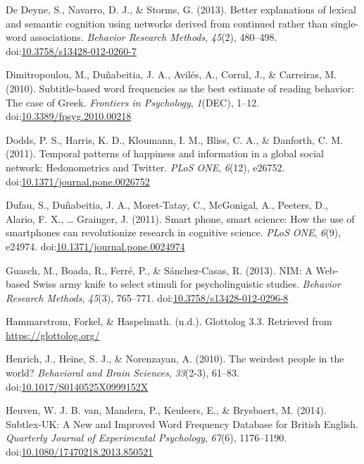 \documentclass[english,,man]{apa6}
\theoremstyle{definition}
\theoremstyle{definition}
\theoremstyle{definition}
\theoremstyle{remark}
\begin{document}
\leavevmode\hypertarget{ref-DeDeyne2013}{}%
De Deyne, S., Navarro, D. J., \& Storms, G. (2013). Better explanations
of lexical and semantic cognition using networks derived from continued
rather than single-word associations. \emph{Behavior Research Methods},
\emph{45}(2), 480--498.
doi:\href{https://doi.org/10.3758/s13428-012-0260-7}{10.3758/s13428-012-0260-7}

\leavevmode\hypertarget{ref-Dimitropoulou2010}{}%
Dimitropoulou, M., Duñabeitia, J. A., Avilés, A., Corral, J., \&
Carreiras, M. (2010). Subtitle-based word frequencies as the best
estimate of reading behavior: The case of Greek. \emph{Frontiers in
Psychology}, \emph{1}(DEC), 1--12.
doi:\href{https://doi.org/10.3389/fpsyg.2010.00218}{10.3389/fpsyg.2010.00218}

\leavevmode\hypertarget{ref-Dodds2011}{}%
Dodds, P. S., Harris, K. D., Kloumann, I. M., Bliss, C. A., \& Danforth,
C. M. (2011). Temporal patterns of happiness and information in a global
social network: Hedonometrics and Twitter. \emph{PLoS ONE},
\emph{6}(12), e26752.
doi:\href{https://doi.org/10.1371/journal.pone.0026752}{10.1371/journal.pone.0026752}

\leavevmode\hypertarget{ref-Dufau2011}{}%
Dufau, S., Duñabeitia, J. A., Moret-Tatay, C., McGonigal, A., Peeters,
D., Alario, F. X., \ldots{} Grainger, J. (2011). Smart phone, smart
science: How the use of smartphones can revolutionize research in
cognitive science. \emph{PLoS ONE}, \emph{6}(9), e24974.
doi:\href{https://doi.org/10.1371/journal.pone.0024974}{10.1371/journal.pone.0024974}

\leavevmode\hypertarget{ref-Guasch2013}{}%
Guasch, M., Boada, R., Ferré, P., \& Sánchez-Casas, R. (2013). NIM: A
Web-based Swiss army knife to select stimuli for psycholinguistic
studies. \emph{Behavior Research Methods}, \emph{45}(3), 765--771.
doi:\href{https://doi.org/10.3758/s13428-012-0296-8}{10.3758/s13428-012-0296-8}

\leavevmode\hypertarget{ref-Glottolog}{}%
Hammarstrom, Forkel, \& Haspelmath. (n.d.). Glottolog 3.3. Retrieved
from \url{https://glottolog.org/}

\leavevmode\hypertarget{ref-Henrich2010}{}%
Henrich, J., Heine, S. J., \& Norenzayan, A. (2010). The weirdest people
in the world? \emph{Behavioral and Brain Sciences}, \emph{33}(2-3),
61--83.
doi:\href{https://doi.org/10.1017/S0140525X0999152X}{10.1017/S0140525X0999152X}

\leavevmode\hypertarget{ref-VanHeuven2014}{}%
Heuven, W. J. B. van, Mandera, P., Keuleers, E., \& Brysbaert, M.
(2014). Subtlex-UK: A New and Improved Word Frequency Database for
British English. \emph{Quarterly Journal of Experimental Psychology},
\emph{67}(6), 1176--1190.
doi:\href{https://doi.org/10.1080/17470218.2013.850521}{10.1080/17470218.2013.850521}
\end{document}
